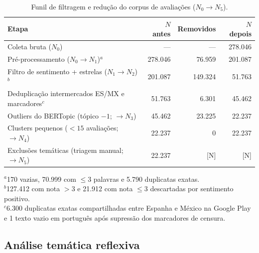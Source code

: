 \begin{table}[htbp]
\centering
\caption{Funil de filtragem e redução do corpus de avaliações ($N_0 \to N_5$).}
\label{tab:funil}
\small
\begin{tabular}{lrrr}
\toprule
\textbf{Etapa} & \textbf{$N$ antes} & \textbf{Removidos} & \textbf{$N$ depois} \\
\midrule
Coleta bruta ($N_0$)                                      & ---     & ---     & 278.046 \\
Pré-processamento ($N_0 \to N_1$)$^a$                     & 278.046 &  76.959 & 201.087 \\
Filtro de sentimento + estrelas ($N_1 \to N_2$)$^b$       & 201.087 & 149.324 &  51.763 \\
Deduplicação intermercados ES/MX e marcadores$^c$         &  51.763 &   6.301 &  45.462 \\
Outliers do BERTopic (tópico $-1$; $\to N_3$)             &  45.462 &  23.225 &  22.237 \\
Clusters pequenos ($< 15$ avaliações; $\to N_4$)          &  22.237 &       0 &  22.237 \\
Exclusões temáticas (triagem manual; $\to N_5$)           &  22.237 &     [N] &     [N] \\
\bottomrule
\end{tabular}

\smallskip
\raggedright\scriptsize
$^a$170 vazias, 70.999 com $\le 3$ palavras e 5.790 duplicatas exatas.\\
$^b$127.412 com nota $> 3$ e 21.912 com nota $\le 3$ descartadas por sentimento positivo.\\
$^c$6.300 duplicatas exatas compartilhadas entre Espanha e México na Google Play e 1 texto vazio em português após supressão dos marcadores de censura.
\end{table}

\subsection{Análise temática reflexiva}
